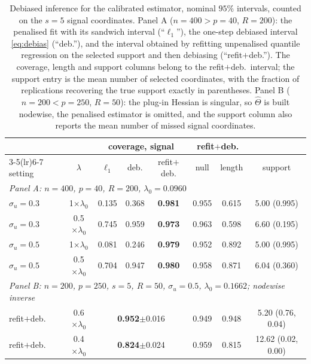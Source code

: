 \begin{table}[ht]
\centering
\scriptsize
\setlength{\tabcolsep}{4pt}
\caption{Debiased inference for the calibrated estimator, nominal $95\%$ intervals, counted on the $s=5$ signal coordinates. Panel A ($n=400>p=40$, $R=200$): the penalised fit with its sandwich interval (``$\ell_1$''), the one-step debiased interval \eqref{eq:debias} (``deb.''), and the interval obtained by refitting unpenalised quantile regression on the selected support and then debiasing (``refit$+$deb.''). The coverage, length and support columns belong to the refit$+$deb.\ interval; the support entry is the mean number of selected coordinates, with the fraction of replications recovering the true support exactly in parentheses. Panel B ($n=200<p=250$, $R=50$): the plug-in Hessian is singular, so $\hat\Theta$ is built nodewise, the penalised estimator is omitted, and the support column also reports the mean number of missed signal coordinates.}
\label{tab:debias}
\begin{tabular}{lccccccc}
\toprule
& & \multicolumn{3}{c}{coverage, signal} & \multicolumn{2}{c}{refit$+$deb.} & \\
\cmidrule(lr){3-5}\cmidrule(lr){6-7}
setting & $\lambda$ & $\ell_1$ & deb. & refit$+$deb. & null & length & support \\
\midrule
\multicolumn{8}{l}{\emph{Panel A: $n=400$, $p=40$, $R=200$, $\lambda_0=0.0960$}}\\
$\sigma_u=0.3$ & 1$\times\lambda_0$ & 0.135 & 0.368 & \textbf{0.981} & 0.955 & 0.615 & 5.00 (0.995) \\
$\sigma_u=0.3$ & 0.5$\times\lambda_0$ & 0.745 & 0.959 & \textbf{0.973} & 0.963 & 0.598 & 6.60 (0.195) \\
$\sigma_u=0.5$ & 1$\times\lambda_0$ & 0.081 & 0.246 & \textbf{0.979} & 0.952 & 0.892 & 5.00 (0.995) \\
$\sigma_u=0.5$ & 0.5$\times\lambda_0$ & 0.704 & 0.947 & \textbf{0.980} & 0.958 & 0.871 & 6.04 (0.360) \\
\midrule
\multicolumn{8}{l}{\emph{Panel B: $n=200$, $p=250$, $s=5$, $R=50$, $\sigma_u=0.5$, $\lambda_0=0.1662$; nodewise inverse}}\\
refit$+$deb. & 0.6$\times\lambda_0$ & \multicolumn{3}{c}{\textbf{0.952}$\pm$0.016} & 0.949 & 0.948 & 5.20 (0.76, 0.04) \\
refit$+$deb. & 0.4$\times\lambda_0$ & \multicolumn{3}{c}{\textbf{0.824}$\pm$0.024} & 0.959 & 0.815 & 12.62 (0.02, 0.00) \\
\bottomrule
\end{tabular}
\end{table}
